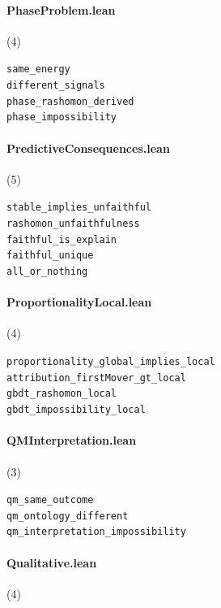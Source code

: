 \paragraph{PhaseProblem.lean} (4)

{\footnotesize
\texttt{same\_energy}\\
\texttt{different\_signals}\\
\texttt{phase\_rashomon\_derived}\\
\texttt{phase\_impossibility}\\
}

\paragraph{PredictiveConsequences.lean} (5)

{\footnotesize
\texttt{stable\_implies\_unfaithful}\\
\texttt{rashomon\_unfaithfulness}\\
\texttt{faithful\_is\_explain}\\
\texttt{faithful\_unique}\\
\texttt{all\_or\_nothing}\\
}

\paragraph{ProportionalityLocal.lean} (4)

{\footnotesize
\texttt{proportionality\_global\_implies\_local}\\
\texttt{attribution\_firstMover\_gt\_local}\\
\texttt{gbdt\_rashomon\_local}\\
\texttt{gbdt\_impossibility\_local}\\
}

\paragraph{QMInterpretation.lean} (3)

{\footnotesize
\texttt{qm\_same\_outcome}\\
\texttt{qm\_ontology\_different}\\
\texttt{qm\_interpretation\_impossibility}\\
}

\paragraph{Qualitative.lean} (4)


